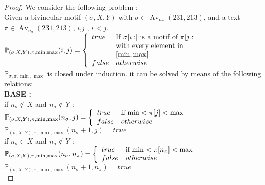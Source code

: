\documentclass[a4paper]{llncs}
\DeclareMathOperator{\Avd}{Av}
\newcommand\Av[2]{\Avd_{{#1}}({#2})}
\newcommand{\ptext}{\pi}
\newcommand{\pmotif}{\sigma}
\newcommand{\x}{X}
\newcommand{\y}{Y}
\newcommand{\bmotif}{(\sigma,\x,\y)}
\begin{document}
			\begin{proof}
			We consider the following problem :\\
			
			Given a bivincular motif $\bmotif$ with $\pmotif \in \Av{n_\pmotif}{231,213} $, and a text $\ptext \in \Av{n_\ptext}{231,213}$, $i$,$j$ , $i<j$.\\
			
			$\mathbb{P}_{\bmotif,\ptext,\min,\max}(i,j)= \left\{ 
				\begin{array}{l l}
					true & \text{If $\pmotif[i:]$ is a motif of $\ptext[j:]$}\\
						& \text{with every element in}\\ 
						&[\min,\max]\\
		
					false & otherwise\\
				\end{array} \right.$\\
		
		
		
		
			$\mathbb{P}_{\pmotif,\ptext,\min,\max}$ is closed under induction. 
			it can be
			solved by means of the following relations:\\
			
			
			\textbf{BASE :} \\
			
			if $n_\pmotif \notin  \x $
			and $n_\pmotif \notin  \y$ : \\		
			$\mathbb{P}_{\bmotif,\ptext,\min,\max}(n_\pmotif,j)= \left\{ 
					\begin{array}{l l}
						true & \text{if $\min<\ptext[j]<\max$
						}\\
						false & otherwise\\
					\end{array} \right. $\\	
			$\mathbb{P}_{\bmotif,\ptext,\min,\max}(n_\pmotif+1,j)= true $\\
			
			if $n_\pmotif \in  \x $
			and $n_\pmotif \notin  \y$ : \\		
			$\mathbb{P}_{\bmotif,\ptext,\min,\max}(n_\pmotif,n_\ptext)= \left\{ 
					\begin{array}{l l}
						true & \text{if $\min<\ptext[n_\ptext]<\max$
						}\\
						false & otherwise\\
					\end{array} \right. $\\	
			$\mathbb{P}_{\bmotif,\ptext,\min,\max}(n_\pmotif+1,n_\ptext)= true $\\
			

\end{proof}
\end{document}
